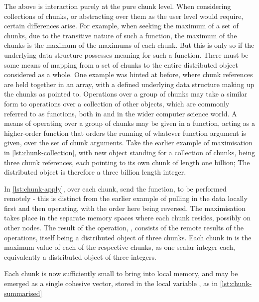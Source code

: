 The above is interaction purely at the pure chunk level.
When considering collections of chunks, or abstracting over them as the user level would require, certain differences arise.
For example, when seeking the maximum of a set of chunks, due to the transitive nature of such a function, the maximum of the chunks is the maximum of the maximums of each chunk.
But this is only so if the underlying data structure possesses meaning for such a function.
There must be some means of mapping from a set of chunks to the entire distributed object considered as a whole.
One example was hinted at before, where chunk references are held together in an array, with a defined underlying data structure making up the chunks as pointed to.
Operations over a group of chunks may take a similar form to operations over a collection of other objects, which are commonly referred to as  functions, both in \R{} and in the wider computer science world.
A means of operating over a group of chunks may be given in a  function, acting as a higher-order function that orders the running of whatever function argument is given, over the set of chunk arguments.
Take the earlier example of maximisation in \cref{lst:chunk-collection}, with new object  standing for a collection of chunks, being three chunk references, each pointing to its own chunk of length one billion; The distributed object is therefore a three billion length integer.


In \cref{lst:chunk-apply}, over each chunk, send the  function, to be performed remotely - this is distinct from the earlier example of pulling in the data locally first and then operating, with the order here being reversed.
The maximisation takes place in the separate memory spaces where each chunk resides, possibly on other nodes.
The result of the operation, , consists of the remote results of the operations, itself being a distributed object of three chunks.
Each chunk in  is the maximum value of each of the respective  chunks, as one scalar integer each, equivalently a distributed object of three integers.


Each chunk is now sufficiently small to bring into local memory, and may be emerged as a single cohesive vector, stored in the local variable , as in \cref{lst:chunk-summarised}

